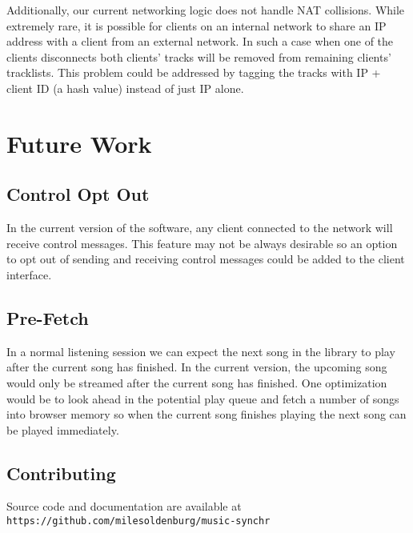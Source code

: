 \documentclass[12pt]{article}
\begin{document}
Additionally, our current networking logic does not handle NAT collisions. While extremely rare, it is possible for clients on an internal network to share an IP address with a client from an external network. In such a case when one of the clients disconnects both clients’ tracks will be removed from remaining clients’ tracklists. This problem could be addressed by tagging the tracks with IP + client ID (a hash value) instead of just IP alone.

\section{Future Work}

\subsection{Control Opt Out}
In the current version of the software, any client connected to the network will receive control messages. This feature may not be always desirable so an option to opt out of sending and receiving control messages could be added to the client interface.

\subsection{Pre-Fetch}
In a normal listening session we can expect the next song in the library to play after the current song has finished. In the current version, the upcoming song would only be streamed after the current song has finished. One optimization would be to look ahead in the potential play queue and fetch a number of songs into browser memory so when the current song finishes playing the next song can be played immediately.

\subsection{Contributing}
\begin{center}
Source code and documentation are available at
{\tt https://github.com/milesoldenburg/music-synchr}
\end{center}
\end{document}
